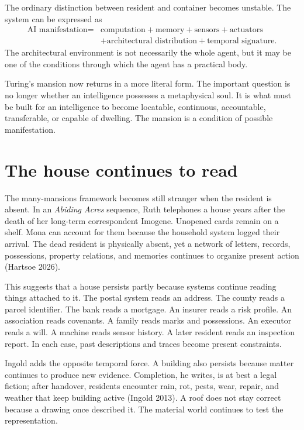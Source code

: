 \documentclass[11pt]{article}
\begin{document}
The ordinary distinction between resident and container becomes unstable. The system can be expressed as
\[
\begin{aligned}
\text{AI manifestation} ={}& \text{computation} + \text{memory} + \text{sensors} + \text{actuators} \\
&+ \text{architectural distribution} + \text{temporal signature}.
\end{aligned}
\]
The architectural environment is not necessarily the whole agent, but it may be one of the conditions through which the agent has a practical body.

Turing's mansion now returns in a more literal form. The important question is no longer whether an intelligence possesses a metaphysical soul. It is what must be built for an intelligence to become locatable, continuous, accountable, transferable, or capable of dwelling. The mansion is a condition of possible manifestation.

\section{The house continues to read}

The many-mansions framework becomes still stranger when the resident is absent. In an \emph{Abiding Acres} sequence, Ruth telephones a house years after the death of her long-term correspondent Imogene. Unopened cards remain on a shelf. Mona can account for them because the household system logged their arrival. The dead resident is physically absent, yet a network of letters, records, possessions, property relations, and memories continues to organize present action (Hartsoe 2026).

This suggests that a house persists partly because systems continue reading things attached to it. The postal system reads an address. The county reads a parcel identifier. The bank reads a mortgage. An insurer reads a risk profile. An association reads covenants. A family reads marks and possessions. An executor reads a will. A machine reads sensor history. A later resident reads an inspection report. In each case, past descriptions and traces become present constraints.

Ingold adds the opposite temporal force. A building also persists because matter continues to produce new evidence. Completion, he writes, is at best a legal fiction; after handover, residents encounter rain, rot, pests, wear, repair, and weather that keep building active (Ingold 2013). A roof does not stay correct because a drawing once described it. The material world continues to test the representation.
\end{document}
